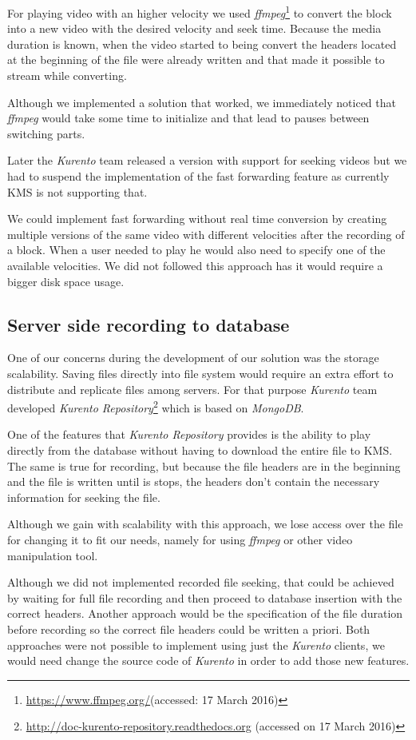 	For playing video with an higher velocity we used \emph{ffmpeg}\footnote{\url{https://www.ffmpeg.org/}(accessed: 17 March 2016)} to convert the block into a new video with the desired velocity and seek time. Because the media duration is known, when the video started to being convert the headers located at the beginning of the file were already written and that made it possible to stream while converting.


	Although we implemented a solution that worked, we immediately noticed that \emph{ffmpeg} would take some time to initialize and that lead to pauses between switching parts.

	Later the \emph{Kurento} team released a version with support for seeking videos but we had to suspend the implementation of the fast forwarding feature as currently \ac{KMS} is not supporting that.

	We could implement fast forwarding without real time conversion by creating multiple versions of the same video with different velocities after the recording of a block. When a user needed to play he would also need to specify one of the available velocities. We did not followed this approach has it would require a bigger disk space usage. 

\subsection{Server side recording to database}

	One of our concerns during the development of our solution was the storage scalability. Saving files directly into file system would require an extra effort to distribute and replicate files among servers. For that purpose \emph{Kurento} team developed \emph{Kurento Repository}\footnote{\url{http://doc-kurento-repository.readthedocs.org} (accessed on 17 March 2016)} which is based on \emph{MongoDB}.

	One of the features that \emph{Kurento Repository} provides is the ability to play directly from the database without having to download the entire file to \ac{KMS}. The same is true for recording, but because the file headers are in the beginning and the file is written until is stops, the headers don't contain the necessary information for seeking the file.

	Although we gain with scalability with this approach, we lose access over the file for changing it to fit our needs, namely for using \emph{ffmpeg} or other video manipulation tool.

	Although we did not implemented recorded file seeking, that could be achieved by waiting for full file recording and then proceed to database insertion with the correct headers. Another approach would be the specification of the file duration before recording so the correct file headers could be written a priori. Both approaches were not possible to implement using just the \emph{Kurento} clients, we would need change the source code of \emph{Kurento} in order to add those new features.






